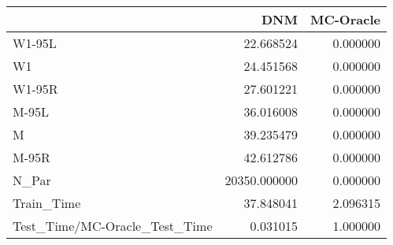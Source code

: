 \begin{tabular}{lrr}
\toprule
{} &           DNM &  MC-Oracle \\
\midrule
W1-95L                        &     22.668524 &   0.000000 \\
W1                            &     24.451568 &   0.000000 \\
W1-95R                        &     27.601221 &   0.000000 \\
M-95L                         &     36.016008 &   0.000000 \\
M                             &     39.235479 &   0.000000 \\
M-95R                         &     42.612786 &   0.000000 \\
N\_Par                         &  20350.000000 &   0.000000 \\
Train\_Time                    &     37.848041 &   2.096315 \\
Test\_Time/MC-Oracle\_Test\_Time &      0.031015 &   1.000000 \\
\bottomrule
\end{tabular}
